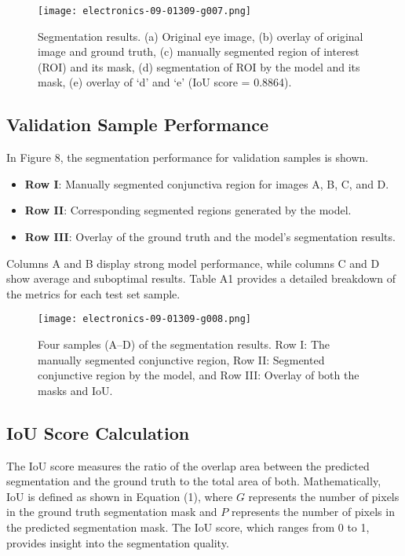 \documentclass[conference]{IEEEtran}
\begin{document}
\begin{figure}[htbp]
\centerline{\texttt{[image: electronics-09-01309-g007.png]}}
\caption{Segmentation results. (a) Original eye image, (b) overlay of original image and ground truth, (c) manually segmented region of interest (ROI) and its mask, (d) segmentation of ROI by the model and its mask, (e) overlay of ‘d’ and ‘e’ (IoU score = 0.8864).}
\label{fig}
\end{figure}

\subsection{\textbf{Validation Sample Performance}}
In Figure 8, the segmentation performance for validation samples is shown. 
\begin{itemize}
    \item \textbf{Row I}: Manually segmented conjunctiva region for images A, B, C, and D.
    \item \textbf{Row II}: Corresponding segmented regions generated by the model.
    \item \textbf{Row III}: Overlay of the ground truth and the model's segmentation results. 
\end{itemize}
Columns A and B display strong model performance, while columns C and D show average and suboptimal results. Table A1 provides a detailed breakdown of the metrics for each test set sample.

\begin{figure}[htbp]
\centerline{\texttt{[image: electronics-09-01309-g008.png]}}
\caption{Four samples (A–D) of the segmentation results. Row I: The manually segmented conjunctive region, Row II: Segmented conjunctive region by the model, and Row III: Overlay of both the masks and IoU. }
\label{fig}
\end{figure}

\subsection{\textbf{IoU Score Calculation}}
The IoU score measures the ratio of the overlap area between the predicted segmentation and the ground truth to the total area of both. Mathematically, IoU is defined as shown in Equation (1), where \( G \) represents the number of pixels in the ground truth segmentation mask and \( P \) represents the number of pixels in the predicted segmentation mask. The IoU score, which ranges from 0 to 1, provides insight into the segmentation quality.
\end{document}
